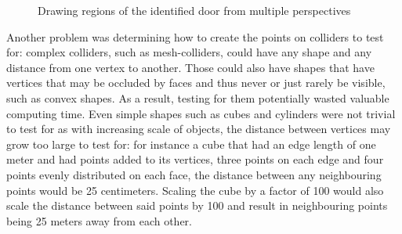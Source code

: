 \begin{figure}[htp]
{    }\quad
    \quad
    \caption[Raycasting and projection approach]{Drawing regions of the identified door from multiple perspectives}
    \label{fig:w2s-labelling}
\end{figure}
Another problem was determining how to create the points on colliders to test for: complex colliders, such as mesh-colliders, could have any shape and any distance from one vertex to another. Those could also have shapes that have vertices that may be occluded by faces and thus never or just rarely be visible, such as convex shapes. As a result, testing for them potentially wasted valuable computing time. Even simple shapes such as cubes and cylinders were not trivial to test for as with increasing scale of objects, the distance between vertices may grow too large to test for: for instance a cube that had an edge length of one meter and had points added to its vertices, three points on each edge and four points evenly distributed on each face, the distance between any neighbouring points would be 25 centimeters. Scaling the cube by a factor of 100 would also scale the distance between said points by 100 and result in neighbouring points being 25 meters away from each other.\\
